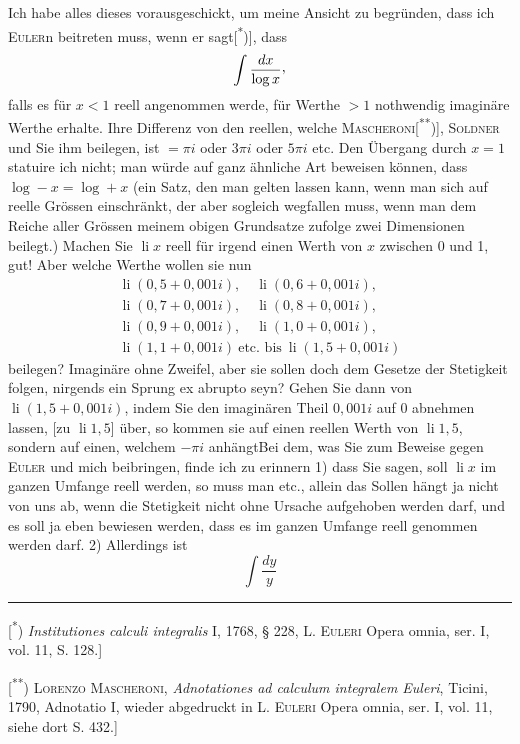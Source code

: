 \indent Ich habe alles dieses vorausgeschickt, um meine Ansicht zu begründen, dass ich \textsc{Euler}n beitreten muss, wenn er sagt[\textsuperscript{*})], dass
\[
\int\frac{dx}{\log x}\mathpunct{\raisebox{.35ex}{,}}
\]
\noindent falls es für $x<1$ reell angenommen werde, für Werthe $>1$ nothwendig imaginäre Werthe erhalte. Ihre Differenz von den reellen, welche \textsc{Mascheroni}[\textsuperscript{**})], \textsc{Soldner} und Sie ihm beilegen, ist $=\pi i$ oder $3\pi i$ oder $5\pi i$ etc. Den Übergang durch $x=1$ statuire ich nicht; man würde auf ganz ähnliche Art beweisen können, dass $\log-x=\log+x$ (ein Satz, den man gelten lassen kann, wenn man sich auf reelle Grössen einschränkt, der aber sogleich wegfallen muss, wenn man dem Reiche aller Grössen meinem obigen Grundsatze zufolge zwei Dimensionen beilegt.) Machen Sie $\operatorname{li}x$ reell für irgend einen Werth von $x$ zwischen 0 und 1, gut! Aber welche Werthe wollen sie nun
\[
\begin{gathered}
\operatorname{li}(0{,}5+0{,}001i),\quad\operatorname{li}(0{,}6+0{,}001i),\\
\operatorname{li}(0{,}7+0{,}001i),\quad\operatorname{li}(0{,}8+0{,}001i),\\
\operatorname{li}(0{,}9+0{,}001i),\quad\operatorname{li}(1{,}0+0{,}001i),\\
\operatorname{li}(1{,}1+0{,}001i)\ \text{etc. bis}\ \operatorname{li}(1{,}5+0{,}001i)
\end{gathered}
\]
\noindent beilegen? Imaginäre ohne Zweifel, aber sie sollen doch dem Gesetze der Stetigkeit folgen, nirgends ein Sprung ex abrupto seyn? Gehen Sie dann von $\operatorname{li}(1{,}5+0{,}001i)$, indem Sie den imaginären Theil $0{,}001i$ auf 0 abnehmen lassen, [zu $\operatorname{li}1{,}5$] über, so kommen sie  auf einen reellen Werth von $\operatorname{li}1{,}5$, sondern auf einen, welchem $-\pi i$ anhängt\quad Bei dem, was Sie zum Beweise gegen \textsc{Euler} und mich beibringen, finde ich zu erinnern 1) dass Sie sagen, soll $\operatorname{li}x$ im ganzen Umfange reell werden, so muss man etc., allein das Sollen hängt ja nicht von uns ab, wenn die Stetigkeit nicht ohne Ursache aufgehoben werden darf, und es soll ja eben bewiesen werden, dass es im ganzen Umfange reell genommen werden darf. 2) Allerdings ist
\[
\int\frac{dy}{y}
\]
\par\medskip\noindent\rule{.24\linewidth}{.4pt}\par\smallskip
{\small
\noindent\hspace*{\parindent}[\textsuperscript{*}) \textit{Institutiones calculi integralis} I, 1768, § 228, L. \textsc{Euleri} Opera omnia, ser. I, vol. 11, S. 128.]
\par\noindent\hspace*{\parindent}[\textsuperscript{**}) \textsc{Lorenzo Mascheroni}, \textit{Adnotationes ad calculum integralem Euleri}, Ticini, 1790, Adnotatio I, wieder abgedruckt in L. \textsc{Euleri} Opera omnia, ser. I, vol. 11, siehe dort S. 432.]
\par}
